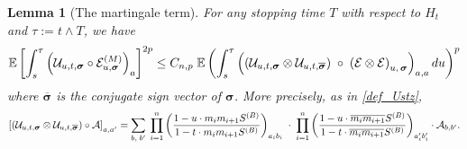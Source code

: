\documentclass[10pt,reqno]{article}
\theoremstyle{plain} %
\newtheorem{lemma}[theorem]{Lemma}
\theoremstyle{remark}
\numberwithin{equation}{section}
\begin{document}
\begin{lemma}[The martingale term]\label{lem:DIfREP}
For any stopping time $T$ with respect to  $H_t$ and  $\tau:= t\wedge T$, we have  
 \begin{equation}\label{alu9_STime}
   \mathbb{E} \left [    \int_{s}^\tau\left(\mathcal{U}_{u, t, \boldsymbol{\sigma}} \circ \mathcal{E}^{(M)}_{u, \boldsymbol{\sigma}}\right)_{\textbf{a}} \right ]^{2p} 
   \le C_{n,p} \; 
   \mathbb{E} \left(\int_{s}^\tau 
   \left(\left(
   \mathcal{U}_{u, t,  \boldsymbol{\sigma}}
   \otimes 
   \mathcal{U}_{u, t,  \overline{\boldsymbol{\sigma}}}
   \right) \;\circ  \;
   \left( \mathcal{E} \otimes  \mathcal{E} \right)
   _{u, \,\boldsymbol{\sigma}  }
   \right)_{{\textbf a}, {\textbf a}}du 
   \right)^{p}
  \end{equation} 
  where  $\overline{\boldsymbol{\sigma}}$ is the conjugate sign vector of ${\boldsymbol{\sigma}}$. More precisely, as in \eqref{def_Ustz}, 
  $$
  \left[\left(
   \mathcal{U}_{u, t,  \boldsymbol{\sigma}}
   \otimes 
   \mathcal{U}_{u, t,  \overline{\boldsymbol{\sigma}}}
   \right)\circ \cal A\right]_{\textbf{a},\textbf{a}'}=
   \sum_{\textbf{b},\;\textbf{b}'} \; \prod_{i=1}^n \left(\frac{1 - u \cdot m_i m_{i+1} S^{(B)}}{1 - t \cdot m_i m_{i+1} S^{(B)}}\right)_{a_i b_i}
   \;\cdot \;\prod_{i=1}^n \left(\frac{1 - u \cdot \overline{m_i m_{i+1}} S^{(B)}}{1 - t \cdot \overline{m_i m_{i+1}} S^{(B)}}\right)_{a'_i b'_i} \cdot \mathcal{A}_{\textbf{b},\textbf{b}'}.
  $$
\end{lemma}
\end{document}
